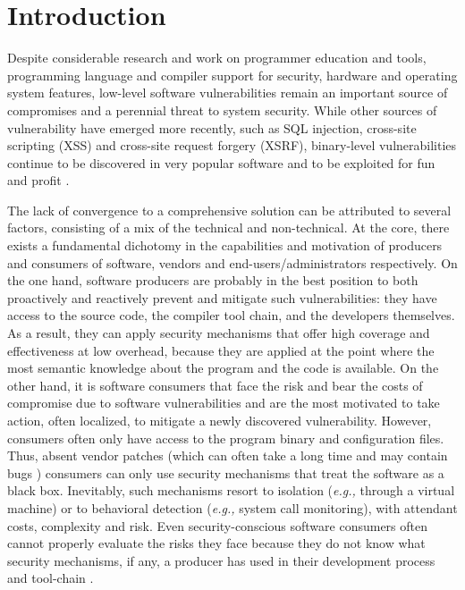 \section{Introduction}
\label{sec:introduction}


Despite considerable research and work on programmer education and
tools, programming language and compiler support for security,
hardware and operating system features, low-level software
vulnerabilities remain an important source of compromises and a
perennial threat to system security. While other sources of
vulnerability have emerged more recently, such as SQL injection,
cross-site scripting (XSS) and cross-site request forgery (XSRF),
binary-level vulnerabilities continue to be discovered in very popular
software \cite{flash-overflow,ms-overflows} and to be exploited for
fun and profit \cite{buffer-overflows}.

The lack of convergence to a comprehensive solution can be attributed
to several factors, consisting of a mix of the technical and
non-technical. At the core, there exists a fundamental dichotomy in
the capabilities and motivation of producers and consumers of
software, vendors and end-users/administrators respectively. On the
one hand, software producers are probably in the best position to both
proactively and reactively prevent and mitigate such vulnerabilities:
they have access to the source code, the compiler tool chain, and the
developers themselves. As a result, they can apply security mechanisms
that offer high coverage and effectiveness at low overhead, because
they are applied at the point where the most semantic knowledge about
the program and the code is available. On the other hand, it is
software consumers that face the risk and bear the costs of compromise
due to software vulnerabilities and are the most motivated to take
action, often localized, to mitigate a newly discovered
vulnerability. However, consumers often only have access to the
program binary and configuration files. Thus, absent vendor patches
(which can often take a long time and may contain bugs \cite{patches})
consumers can only use security mechanisms that treat the
software as a black box. Inevitably, such mechanisms resort to
isolation ({\it e.g.,} through a virtual machine) or to behavioral
detection ({\it e.g.,} system call monitoring), with attendant costs,
complexity and risk. Even security-conscious software consumers often
cannot properly evaluate the risks they face because they do not know
what security mechanisms, if any, a producer has used in their
development process and tool-chain \cite{securitybugs2003}.

